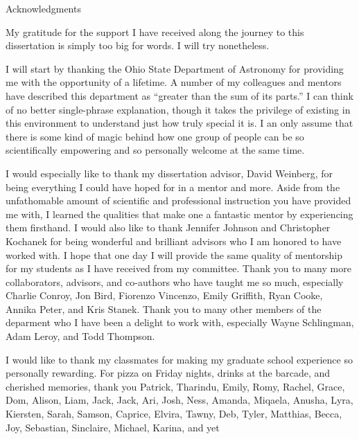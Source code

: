 \documentclass[main.tex]{subfiles}
\begin{document}
\vspace*{1cm}
\begin{center}
{\large Acknowledgments}
\end{center}

\begin{doublespace}

My gratitude for the support I have received along the journey to this
dissertation is simply too big for words.
I will try nonetheless.
\par
I will start by thanking the Ohio State Department of Astronomy for providing
me with the opportunity of a lifetime.
A number of my colleagues and mentors have described this department as
``greater than the sum of its parts.''
I can think of no better single-phrase explanation, though it takes the
privilege of existing in this environment to understand just how truly special
it is.
I an only assume that there is some kind of magic behind how one group of
people can be so scientifically empowering and so personally welcome at the
same time.
\par
I would especially like to thank my dissertation advisor, David Weinberg, for
being everything I could have hoped for in a mentor and more.
Aside from the unfathomable amount of scientific and professional instruction
you have provided me with, I learned the qualities that make one a fantastic
mentor by experiencing them firsthand.
I would also like to thank Jennifer Johnson and Christopher Kochanek for being
wonderful and brilliant advisors who I am honored to have worked with.
I hope that one day I will provide the same quality of mentorship for my
students as I have received from my committee.
Thank you to many more collaborators, advisors, and co-authors who have taught
me so much, especially Charlie Conroy, Jon Bird, Fiorenzo Vincenzo, Emily
Griffith, Ryan Cooke, Annika Peter, and Kris Stanek.
Thank you to many other members of the deparment who I have been a delight to
work with, especially Wayne Schlingman, Adam Leroy, and Todd Thompson.
\par
I would like to thank my classmates for making my graduate school experience so
personally rewarding.
For pizza on Friday nights, drinks at the barcade, and cherished memories,
thank you Patrick, Tharindu, Emily,
Romy, Rachel, Grace, Dom, Alison, Liam, Jack, Jack, Ari, Josh, Ness, Amanda,
Miqaela, Anusha, Lyra, Kiersten, Sarah, Samson, Caprice, Elvira, Tawny, Deb,
Tyler, Matthias, Becca, Joy, Sebastian, Sinclaire, Michael, Karina, and yet

\end{doublespace}
\end{document}
